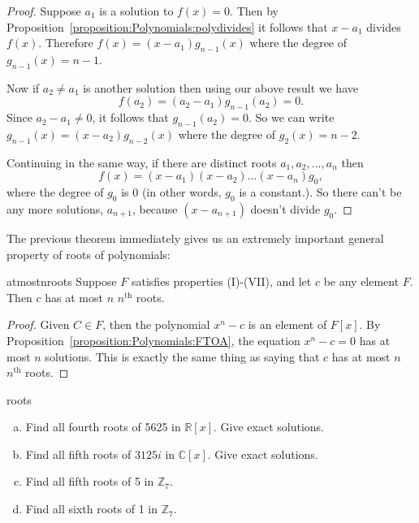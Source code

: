 \begin{proof}
Suppose $a_1$ is a solution to $f(x)=0$. Then by Proposition~\ref{proposition:Polynomials:polydivides} it follows that $x-a_1$ divides $f(x)$. Therefore $f(x) = (x-a_1) g_{n-1}(x)$ where the degree of $g_{n-1}(x)=n-1$. 

Now if $a_2 \neq a_1$ is another solution then using our above result we have
\[ f(a_2) = (a_2 - a_1)g_{n-1}(a_2) = 0. \]
Since $a_2 - a_1 \neq 0$, it follows that $g_{n-1}(a_2) = 0$. So we can write $g_{n - 1}(x) = (x-a_2)g_{n-2}(x)$ where the degree of $g_2(x) = n-2$. 

Continuing in the same way, if there are distinct roots $a_1,a_2,...,a_n$ then 
\[
f(x) = (x - a_1)(x - a_2)...(x - a_n)g_0, \]
 where the degree of $g_0$ is 0 (in other words, $g_0$ is a constant.). So there can't be any more solutions, $a_{n+1}$, because $(x-a_{n+1})$ doesn't divide $g_0$.
\end {proof}

The previous theorem immediately gives us an extremely important general property of roots of polynomials:

\begin{prop}{atmostnroots}
Suppose $F$ satisfies properties (I)-(VII), and let $c$ be any element $F$.  Then $c$ has at most $n$ $n^{\text{th}}$ roots.
\end {prop}


\begin{proof}
Given $C \in F$, then the polynomial $x^n-c$ is an element of $F[x]$. By Proposition~\ref{proposition:Polynomials:FTOA}, the equation $x^n-c=0$ has at most $n$ solutions.  This is exactly the same thing as saying that $c$ has at most $n$ $n^{\text{th}}$ roots.
\end {proof}

\begin{exercise}{roots}
\begin {enumerate}[(a)]
\item
Find all fourth roots of 5625 in $\mathbb{R}[x]$. Give exact solutions.
\item
Find all fifth roots of $3125i$ in $\mathbb{C}[x]$. Give exact solutions. 
\item
Find all fifth roots of 5 in $\mathbb{Z}_7$.
\item
Find all sixth roots of 1 in $\mathbb{Z}_7$.
\end{enumerate}
\end{exercise}


